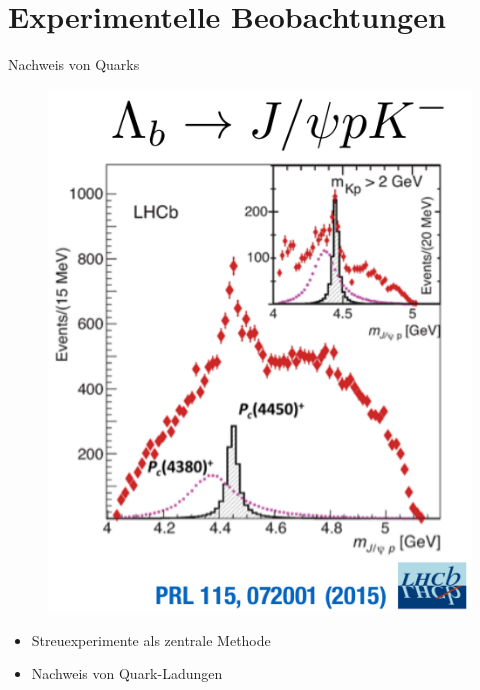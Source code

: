 \documentclass[aspectratio=169]{beamer} %
\begin{document}
    \section{Experimentelle Beobachtungen}
    \begin{frame}{Nachweis von Quarks}
        \begin{figure}
            \centering
            \includegraphics[width=\linewidth, height=0.5\textheight, keepaspectratio]{lhcb-pc4450.png} %
        \end{figure}
        \begin{itemize}
            \item Streuexperimente als zentrale Methode
            \item Nachweis von Quark-Ladungen
        \end{itemize}
    \end{frame}
    
\end{document}
